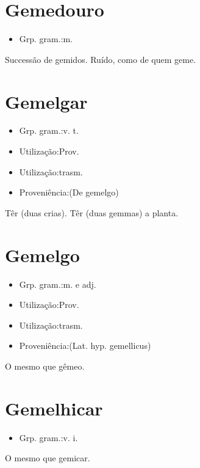 \section{Gemedouro}
\begin{itemize}
\item {Grp. gram.:m.}
\end{itemize}
Successão de gemidos.
Ruído, como de quem geme.
\section{Gemelgar}
\begin{itemize}
\item {Grp. gram.:v. t.}
\end{itemize}
\begin{itemize}
\item {Utilização:Prov.}
\end{itemize}
\begin{itemize}
\item {Utilização:trasm.}
\end{itemize}
\begin{itemize}
\item {Proveniência:(De \textunderscore gemelgo\textunderscore )}
\end{itemize}
Têr (duas crias).
Têr (duas gemmas) a planta.
\section{Gemelgo}
\begin{itemize}
\item {Grp. gram.:m.  e  adj.}
\end{itemize}
\begin{itemize}
\item {Utilização:Prov.}
\end{itemize}
\begin{itemize}
\item {Utilização:trasm.}
\end{itemize}
\begin{itemize}
\item {Proveniência:(Lat. hyp. \textunderscore gemellicus\textunderscore )}
\end{itemize}
O mesmo que \textunderscore gêmeo\textunderscore .
\section{Gemelhicar}
\begin{itemize}
\item {Grp. gram.:v. i.}
\end{itemize}
O mesmo que \textunderscore gemicar\textunderscore .
